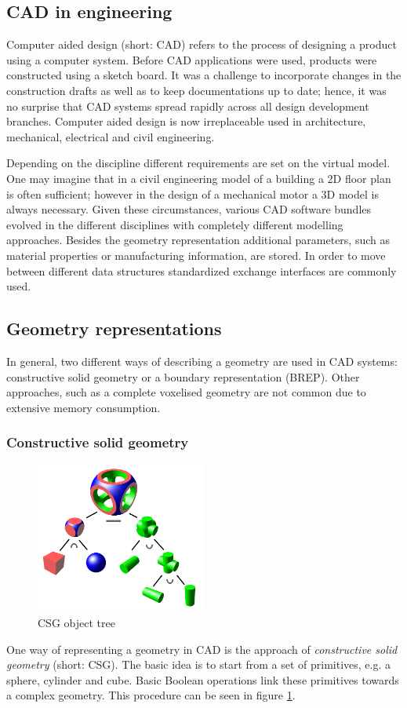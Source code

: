 \subsection{CAD in engineering}
Computer aided design (short: CAD) refers to the process of designing a product using a computer system. Before CAD applications were used, products were constructed using a sketch board. It was a challenge to incorporate changes in the construction drafts as well as to keep documentations up to date; hence, it was no surprise that CAD systems spread rapidly across all design development branches. Computer aided design is now irreplaceable used in architecture, mechanical, electrical and civil engineering.

Depending on the discipline different requirements are set on the virtual model. One may imagine that in a civil engineering model of a building a 2D floor plan is often sufficient; however in the design of a mechanical motor a 3D model is always necessary. Given these circumstances, various CAD software bundles evolved in the different disciplines with completely different modelling approaches. Besides the geometry representation additional parameters, such as material properties or manufacturing information, are stored. In order to move between different data structures standardized exchange interfaces are commonly used.
\subsection{Geometry representations}
In general, two different ways of describing a geometry are used in CAD systems: constructive solid geometry or a boundary representation (BREP). Other approaches, such as a complete voxelised geometry are not common due to extensive memory consumption.
\subsubsection{Constructive solid geometry}
\begin{figure}
\centering
\includegraphics[width=0.5\textwidth]{Pictures/Csg_tree.png}
\caption{CSG object tree}
\label{fig:csg_tree}
\end{figure}
One way of representing a geometry in CAD is the approach of \emph{constructive solid geometry} (short: CSG). The basic idea is to start from a set of primitives, e.g. a sphere, cylinder and cube. Basic Boolean operations link these primitives towards a complex geometry. This procedure can be seen in figure \ref{fig:csg_tree}.

